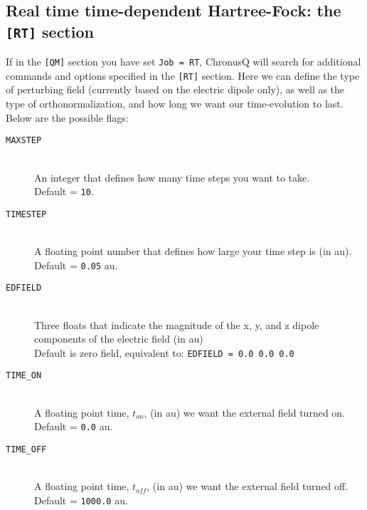 \documentclass[12pt]{article}
\begin{document}
    \subsection{Real time time-dependent Hartree-Fock: the \texttt{[RT]} section} \label{subsec:RTInput}
    If in the \texttt{[QM]} section you have set \texttt{Job = RT}, ChronusQ will search for additional commands and options specified in the \texttt{[RT]} section. Here we can define the type of perturbing field (currently based on the electric dipole only), as well as the type of orthonormalization, and how long we want our time-evolution to last. Below are the possible flags:
    \begin{description}
      \item[\texttt{MAXSTEP}] \hfill \\ 
        An integer that defines how many time steps you want to take. \\
         Default = \texttt{10}.
      \item[\texttt{TIMESTEP}] \hfill \\ 
        A floating point number that defines how large your time step is (in au).  \\
        Default = \texttt{0.05} au.
      \item[\texttt{EDFIELD}] \hfill \\ 
        Three floats that indicate the magnitude of the x, y, and z dipole components of the electric field (in au) \\
          Default is zero field, equivalent to: \texttt{EDFIELD = 0.0 0.0 0.0}
      \item[\texttt{TIME\_ON}] \hfill \\ 
        A floating point time, $t_{on}$, (in au) we want the external field turned on. \\
        Default = \texttt{0.0} au.
      \item[\texttt{TIME\_OFF}] \hfill \\ 
        A floating point time, $t_{off}$, (in au) we want the external field turned off. \\
        Default = \texttt{1000.0} au.

\end{description}
\end{document}
